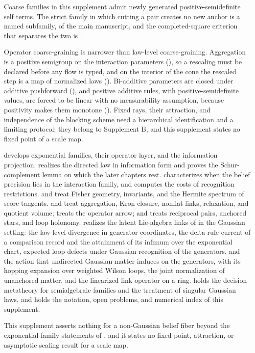Coarse families in this supplement admit newly generated positive-semidefinite
self terms. The strict family in which cutting a pair creates no new anchor is
a named subfamily,  of the main manuscript,
and the completed-square criterion that separates the two is
.

Operator coarse-graining is narrower than law-level coarse-graining.
Aggregation is a positive semigroup on the interaction parameters
(), so a rescaling must be declared before
any flow is typed, and on the interior of the cone the rescaled step is a map
of normalized laws (). Bi-additive
parameters are closed under additive pushforward (),
and positive additive rules, with positive-semidefinite values, are forced to
be linear with no measurability assumption, because positivity makes them
monotone (). Fixed rays, their attraction, and
independence of the blocking scheme need a hierarchical identification and a
limiting protocol; they belong to Supplement B, and this supplement states no
fixed point of a scale map.

 develops exponential families, their operator layer, and
the information projection.  realizes the
directed law in information form and proves the Schur-complement lemma on
which the later chapters rest.  characterizes when the
belief precision lies in the interaction family, and 
computes the costs of recognition restrictions. 
and  treat Fisher geometry, invariants, and the
Hermite spectrum of score tangents.  and
 treat aggregation, Kron closure, nonflat links,
relaxation, and quotient volume;  treats the
operator arrow; and  treats reciprocal pairs, anchored
stars, and loop holonomy.  realizes the latent
Lie-algebra links of  in the Gaussian setting: the law-level
divergence in generator coordinates, the delta-rule current of a comparison
record and the attainment of its infimum over the exponential chart, expected
loop defects under Gaussian recognition of the generators, and the action that
undirected Gaussian matter induces on the generators, with its hopping expansion
over weighted Wilson loops, the joint normalization of unanchored matter, and the
linearized link operator on a ring.  holds the decision
metatheory for semialgebraic families and the treatment of singular Gaussian
laws, and  holds the notation, open problems,
and numerical index of this supplement.

This supplement asserts nothing for a non-Gaussian belief fiber beyond the
exponential-family statements of , and it states no fixed
point, attraction, or asymptotic scaling result for a scale map.
